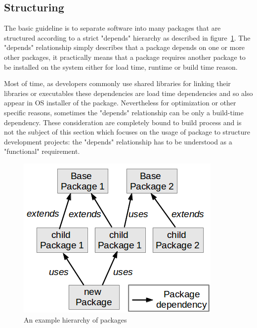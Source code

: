 \documentclass[12pt,a4paper]{article}
\begin{document}
\subsection{Structuring}

The basic guideline is to separate software into many packages that are structured according to a strict "depends" hierarchy as described in figure~\ref{fig-pack-hier}. The "depends" relationship simply describes that a package depends on one or more other packages, it practically means that a package requires another package to be installed on the system either for load time, runtime or build time reason. 

Most of time, as developers commonly use shared libraries for linking their libraries or executables these dependencies are load time dependencies and so also appear in OS installer of the package. Nevertheless for optimization or other specific reasons, sometimes the "depends" relationship can be only a build-time dependency. These consideration are completely bound to build process and is not the subject of this section which focuses on the usage of package to structure development projects: the "depends" relationship has to be understood as a "functional" requirement.
\linebreak

\begin{figure}
\center
\includegraphics[scale=1]{images/package_hierarchy.png}
\caption{An example hierarchy of packages}
\label{fig-pack-hier}
\end{figure}
\end{document}
